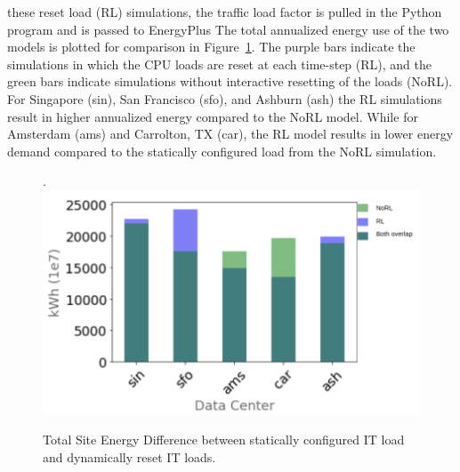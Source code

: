  these reset load (RL) simulations,  the traffic load factor is pulled in  the Python program and is passed to EnergyPlus  The total annualized energy use of the two models is plotted for comparison in Figure~\ref{fig:total_energy_comp_bem}. The purple bars indicate the simulations in which the CPU loads are reset at each time-step (RL), and the green bars indicate simulations without interactive resetting of the loads (NoRL). For Singapore (sin), San Francisco (sfo), and Ashburn (ash) the RL simulations result in higher annualized energy compared to the NoRL model. While for Amsterdam (ams) and Carrolton, TX (car), the RL model results in lower energy demand compared to the statically configured load from the NoRL simulation.

\begin{figure}.
  \centering
  \includegraphics[scale=0.4]{building_energy_model/img/cpu_comps_3legend.png}
  \caption[Comparison of energy demand for two models]{Total Site Energy Difference between statically configured IT load and dynamically reset IT loads.}
  \label{fig:total_energy_comp_bem}
  \end{figure}

